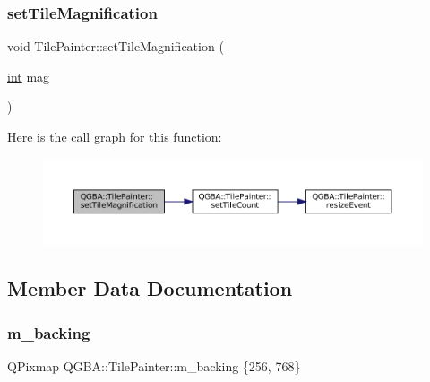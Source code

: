 \subsubsection{\texorpdfstring{set\+Tile\+Magnification}{setTileMagnification}}
{\footnotesize\ttfamily void Tile\+Painter\+::set\+Tile\+Magnification (\begin{DoxyParamCaption}\item[{\mbox{\hyperlink{ioapi_8h_a787fa3cf048117ba7123753c1e74fcd6}{int}}}]{mag }\end{DoxyParamCaption})\hspace{0.3cm}{\ttfamily [slot]}}

Here is the call graph for this function\+:
\nopagebreak
\begin{figure}[H]
\begin{center}
\leavevmode
\includegraphics[width=350pt]{class_q_g_b_a_1_1_tile_painter_ac9e24d354a3f591c46cd74febeabd682_cgraph}
\end{center}
\end{figure}


\subsection{Member Data Documentation}
\mbox{\label{class_q_g_b_a_1_1_tile_painter_a9df39b2be251272063e851ec3893d676}} 
\subsubsection{\texorpdfstring{m\+\_\+backing}{m\_backing}}
{\footnotesize\ttfamily Q\+Pixmap Q\+G\+B\+A\+::\+Tile\+Painter\+::m\+\_\+backing \{256, 768\}\hspace{0.3cm}{\ttfamily [private]}}

\mbox{\label{class_q_g_b_a_1_1_tile_painter_a3997d804e4ddfbff0b362c3c7e0146f8}} 
